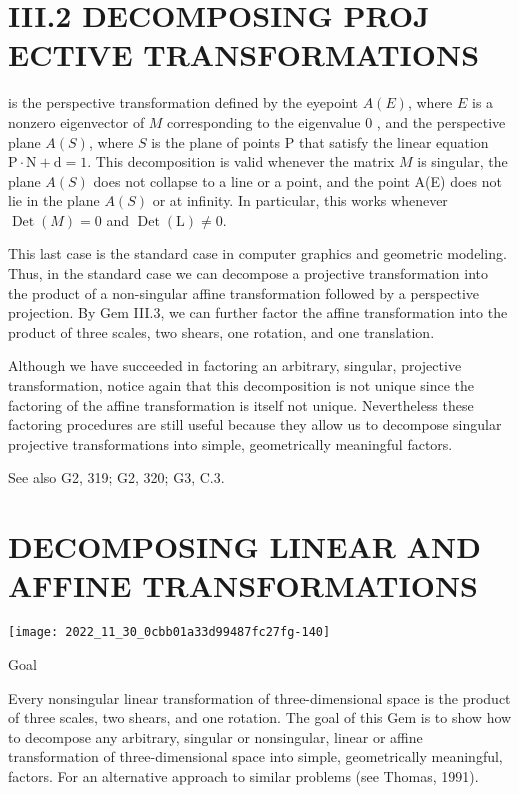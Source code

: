 \section{III.2 DECOMPOSING PROJ ECTIVE TRANSFORMATIONS}
is the perspective transformation defined by the eyepoint $A(E)$, where $E$ is a nonzero eigenvector of $M$ corresponding to the eigenvalue 0 , and the perspective plane $A(S)$, where $S$ is the plane of points $\mathrm{P}$ that satisfy the linear equation $\mathrm{P} \cdot \mathrm{N}+\mathrm{d}=1$. This decomposition is valid whenever the matrix $M$ is singular, the plane $A(S)$ does not collapse to a line or a point, and the point A(E) does not lie in the plane $A(S)$ or at infinity. In particular, this works whenever $\operatorname{Det}(M)=0$ and $\operatorname{Det}(\mathrm{L}) \neq 0$.

This last case is the standard case in computer graphics and geometric modeling. Thus, in the standard case we can decompose a projective transformation into the product of a non-singular affine transformation followed by a perspective projection. By Gem III.3, we can further factor the affine transformation into the product of three scales, two shears, one rotation, and one translation.

Although we have succeeded in factoring an arbitrary, singular, projective transformation, notice again that this decomposition is not unique since the factoring of the affine transformation is itself not unique. Nevertheless these factoring procedures are still useful because they allow us to decompose singular projective transformations into simple, geometrically meaningful factors.

See also G2, 319; G2, 320; G3, C.3.

\section{DECOMPOSING LINEAR AND AFFINE TRANSFORMATIONS}
\begin{center}
\texttt{[image: 2022\_11\_30\_0cbb01a33d99487fc27fg-140]}
\end{center}

Goal

Every nonsingular linear transformation of three-dimensional space is the product of three scales, two shears, and one rotation. The goal of this Gem is to show how to decompose any arbitrary, singular or nonsingular, linear or affine transformation of three-dimensional space into simple, geometrically meaningful, factors. For an alternative approach to similar problems (see Thomas, 1991).

